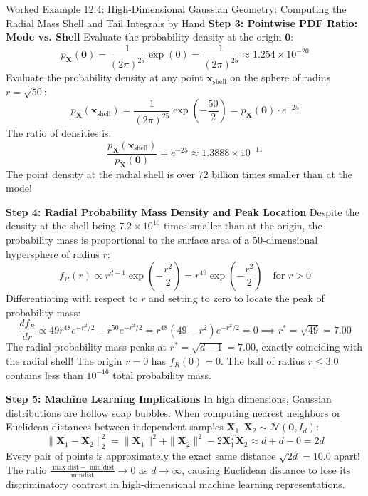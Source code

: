 \begin{examplebox}[breakable]{Worked Example 12.4: High-Dimensional Gaussian Geometry: Computing the Radial Mass Shell and Tail Integrals by Hand}
\textbf{Step 3: Pointwise PDF Ratio: Mode vs. Shell}
Evaluate the probability density at the origin $\mathbf{0}$:
\begin{equation}
p_{\mathbf{X}}(\mathbf{0}) = \frac{1}{(2\pi)^{25}} \exp(0) = \frac{1}{(2\pi)^{25}} \approx 1.254 \times 10^{-20}
\end{equation}
Evaluate the probability density at any point $\mathbf{x}_{\text{shell}}$ on the sphere of radius $r = \sqrt{50}$:
\begin{equation}
p_{\mathbf{X}}(\mathbf{x}_{\text{shell}}) = \frac{1}{(2\pi)^{25}} \exp\left( -\frac{50}{2} \right) = p_{\mathbf{X}}(\mathbf{0}) \cdot e^{-25}
\end{equation}
The ratio of densities is:
\begin{equation}
\frac{p_{\mathbf{X}}(\mathbf{x}_{\text{shell}})}{p_{\mathbf{X}}(\mathbf{0})} = e^{-25} \approx 1.3888 \times 10^{-11}
\end{equation}
The point density at the radial shell is over $72$ billion times smaller than at the mode!

\textbf{Step 4: Radial Probability Mass Density and Peak Location}
Despite the density at the shell being $7.2 \times 10^{10}$ times smaller than at the origin, the probability mass is proportional to the surface area of a $50$-dimensional hypersphere of radius $r$:
\begin{equation}
f_R(r) \propto r^{d-1} \exp\left( -\frac{r^2}{2} \right) = r^{49} \exp\left( -\frac{r^2}{2} \right) \quad \text{for } r > 0
\end{equation}
Differentiating with respect to $r$ and setting to zero to locate the peak of probability mass:
\begin{equation}
\frac{d f_R}{dr} \propto 49 r^{48} e^{-r^2/2} - r^{50} e^{-r^2/2} = r^{48}(49 - r^2) e^{-r^2/2} = 0 \implies r^* = \sqrt{49} = \mathbf{7.00}
\end{equation}
The radial probability mass peaks at $r^* = \sqrt{d - 1} = 7.00$, exactly coinciding with the radial shell!
The origin $r = 0$ has $f_R(0) = 0$. The ball of radius $r \le 3.0$ contains less than $10^{-16}$ total probability mass.

\textbf{Step 5: Machine Learning Implications}
In high dimensions, Gaussian distributions are hollow soap bubbles. 
When computing nearest neighbors or Euclidean distances between independent samples $\mathbf{X}_1, \mathbf{X}_2 \sim \mathcal{N}(\mathbf{0}, I_d)$:
\begin{equation}
\|\mathbf{X}_1 - \mathbf{X}_2\|_2^2 = \|\mathbf{X}_1\|^2 + \|\mathbf{X}_2\|^2 - 2\mathbf{X}_1^T \mathbf{X}_2 \approx d + d - 0 = 2d
\end{equation}
Every pair of points is approximately the exact same distance $\sqrt{2d} = 10.0$ apart! The ratio $\frac{\max \text{dist} - \min \text{dist}}{\min \text{dist}} \to 0$ as $d \to \infty$, causing Euclidean distance to lose its discriminatory contrast in high-dimensional machine learning representations.
\end{examplebox}

